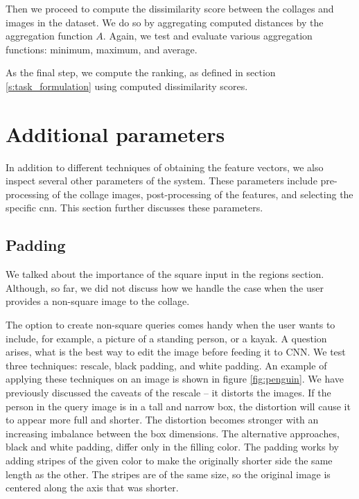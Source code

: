 Then we proceed to compute the dissimilarity score between the collages and images in the dataset. We do so by aggregating computed distances by the aggregation function $A$. Again, we test and evaluate various aggregation functions: minimum, maximum, and average.

As the final step, we compute the ranking, as defined in section \ref{s:task_formulation} using computed dissimilarity scores.

\section{Additional parameters}

In addition to different techniques of obtaining the feature vectors, we also inspect several other parameters of the system. These parameters include pre-processing of the collage images, post-processing of the features, and selecting the specific \acrshort{cnn}. This section further discusses these parameters.

\subsection{Padding}

We talked about the importance of the square input in the regions section. Although, so far, we did not discuss how we handle the case when the user provides a non-square image to the collage.

The option to create non-square queries comes handy when the user wants to include, for example, a picture of a standing person, or a kayak. A question arises, what is the best way to edit the image before feeding it to CNN. We test three techniques: rescale, black padding, and white padding. An example of applying these techniques on an image is shown in figure \ref{fig:penguin}. We have previously discussed the caveats of the rescale -- it distorts the images. If the person in the query image is in a tall and narrow box, the distortion will cause it to appear more full and shorter. The distortion becomes stronger with an increasing imbalance between the box dimensions. The alternative approaches, black and white padding, differ only in the filling color. The padding works by adding stripes of the given color to make the originally shorter side the same length as the other. The stripes are of the same size, so the original image is centered along the axis that was shorter. 

